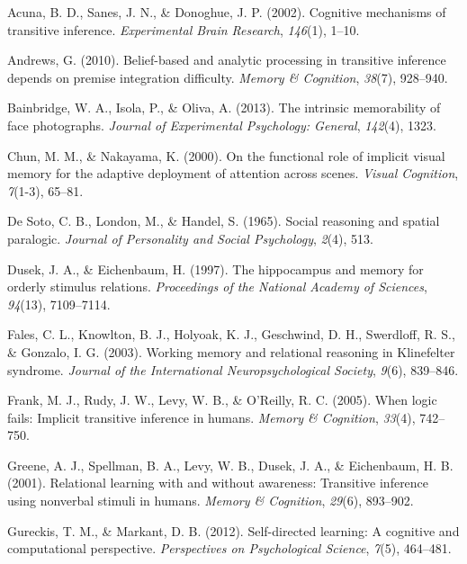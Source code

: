 \documentclass[floatsintext,man]{apa6}
\theoremstyle{definition}
\theoremstyle{definition}
\theoremstyle{definition}
\theoremstyle{remark}
\begin{document}
\hypertarget{refs}{}
\hypertarget{ref-acuna2002cognitive}{}
Acuna, B. D., Sanes, J. N., \& Donoghue, J. P. (2002). Cognitive
mechanisms of transitive inference. \emph{Experimental Brain Research},
\emph{146}(1), 1--10.

\hypertarget{ref-andrews2010belief}{}
Andrews, G. (2010). Belief-based and analytic processing in transitive
inference depends on premise integration difficulty. \emph{Memory \&
Cognition}, \emph{38}(7), 928--940.

\hypertarget{ref-bainbridge2013intrinsic}{}
Bainbridge, W. A., Isola, P., \& Oliva, A. (2013). The intrinsic
memorability of face photographs. \emph{Journal of Experimental
Psychology: General}, \emph{142}(4), 1323.

\hypertarget{ref-chun2000functional}{}
Chun, M. M., \& Nakayama, K. (2000). On the functional role of implicit
visual memory for the adaptive deployment of attention across scenes.
\emph{Visual Cognition}, \emph{7}(1-3), 65--81.

\hypertarget{ref-de1965social}{}
De Soto, C. B., London, M., \& Handel, S. (1965). Social reasoning and
spatial paralogic. \emph{Journal of Personality and Social Psychology},
\emph{2}(4), 513.

\hypertarget{ref-dusek1997hippocampus}{}
Dusek, J. A., \& Eichenbaum, H. (1997). The hippocampus and memory for
orderly stimulus relations. \emph{Proceedings of the National Academy of
Sciences}, \emph{94}(13), 7109--7114.

\hypertarget{ref-fales2003working}{}
Fales, C. L., Knowlton, B. J., Holyoak, K. J., Geschwind, D. H.,
Swerdloff, R. S., \& Gonzalo, I. G. (2003). Working memory and
relational reasoning in Klinefelter syndrome. \emph{Journal of the
International Neuropsychological Society}, \emph{9}(6), 839--846.

\hypertarget{ref-frank2005logic}{}
Frank, M. J., Rudy, J. W., Levy, W. B., \& O'Reilly, R. C. (2005). When
logic fails: Implicit transitive inference in humans. \emph{Memory \&
Cognition}, \emph{33}(4), 742--750.

\hypertarget{ref-greene2001relational}{}
Greene, A. J., Spellman, B. A., Levy, W. B., Dusek, J. A., \&
Eichenbaum, H. B. (2001). Relational learning with and without
awareness: Transitive inference using nonverbal stimuli in humans.
\emph{Memory \& Cognition}, \emph{29}(6), 893--902.

\hypertarget{ref-Gureckis-2012-PPS}{}
Gureckis, T. M., \& Markant, D. B. (2012). Self-directed learning: A
cognitive and computational perspective. \emph{Perspectives on
Psychological Science}, \emph{7}(5), 464--481.
\end{document}
